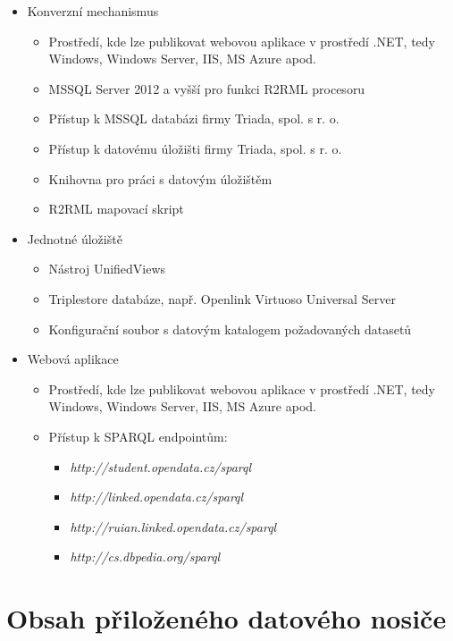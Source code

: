\begin{itemize}
\item Konverzní mechanismus
	\begin{itemize}
	\item Prostředí, kde lze publikovat webovou aplikace v prostředí .NET, tedy Windows, Windows Server, IIS, MS Azure apod.
	\item MSSQL Server 2012 a vyšší pro funkci R2RML procesoru
	\item Přístup k MSSQL databázi firmy Triada, spol. s r. o. 
	\item Přístup k datovému úložišti firmy Triada, spol. s r. o.
	\item Knihovna pro práci s datovým úložištěm 
	\item R2RML mapovací skript
	\end{itemize}
\item Jednotné úložiště
	\begin{itemize}
		\item Nástroj UnifiedViews
		\item Triplestore databáze, např. Openlink Virtuoso Universal Server
		\item Konfigurační soubor s datovým katalogem požadovaných datasetů
	\end{itemize}
\item Webová aplikace
	\begin{itemize}
	\item Prostředí, kde lze publikovat webovou aplikace v prostředí .NET, tedy Windows, Windows Server, IIS, MS Azure apod.
	\item Přístup k SPARQL endpointům:
		\begin{itemize}
		\item \textit{http://student.opendata.cz/sparql}
		\item \textit{http://linked.opendata.cz/sparql}
		\item \textit{http://ruian.linked.opendata.cz/sparql}
		\item \textit{http://cs.dbpedia.org/sparql}
		\end{itemize}	
	\end{itemize}
\end{itemize}




\section*{Obsah přiloženého datového nosiče}

